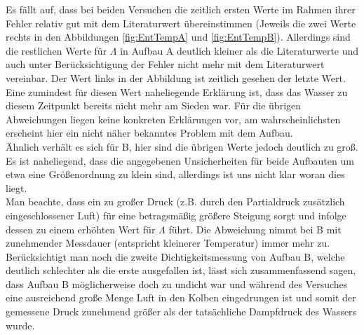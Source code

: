 \documentclass[12pt,a4paper]{article}
\begin{document}
Es fällt auf, dass bei beiden Versuchen die zeitlich ersten Werte im Rahmen ihrer Fehler relativ gut mit dem Literaturwert übereinstimmen (Jeweils die zwei Werte rechts in den Abbildungen \ref{fig:EntTempA} und \ref{fig:EntTempB}).
Allerdings sind die restlichen Werte für $\Lambda$ in Aufbau A deutlich kleiner als die Literaturwerte und auch unter Berücksichtigung der Fehler nicht mehr mit dem Literaturwert vereinbar. Der Wert links in der Abbildung ist zeitlich gesehen der letzte Wert. Eine zumindest für diesen Wert naheliegende Erklärung ist, dass das Wasser zu diesem Zeitpunkt bereits nicht mehr am Sieden war. Für die übrigen Abweichungen liegen keine konkreten Erklärungen vor, am wahrscheinlichsten erscheint hier ein nicht näher bekanntes Problem mit dem Aufbau. \\
Ähnlich verhält es sich für B, hier sind die übrigen Werte jedoch deutlich zu groß.\\
Es ist naheliegend, dass die angegebenen Unsicherheiten für beide Aufbauten um etwa eine Größenordnung zu klein sind, allerdings ist uns nicht klar woran dies liegt.\\
Man beachte, dass ein zu großer Druck (z.B. durch den Partialdruck zusätzlich eingeschlossener Luft) für eine betragsmäßig größere Steigung sorgt und infolge dessen zu einem erhöhten Wert für $\Lambda$ führt.
Die Abweichung nimmt bei B mit zunehmender Messdauer (entspricht kleinerer Temperatur) immer mehr zu. Berücksichtigt man noch die zweite Dichtigkeitsmessung von Aufbau B, welche deutlich schlechter als die erste ausgefallen ist, lässt sich zusammenfassend sagen, dass Aufbau B möglicherweise doch zu undicht war und während des Versuches eine ausreichend große Menge Luft in den Kolben eingedrungen ist und somit der gemessene Druck zunehmend größer als der tatsächliche Dampfdruck des Wassers wurde.\\
\end{document}
